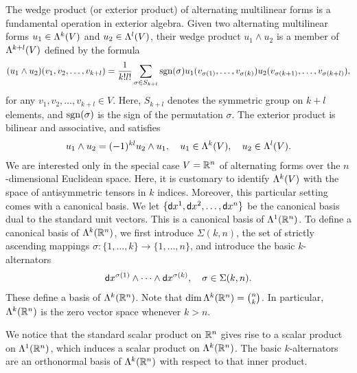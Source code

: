\documentclass[a4paper]{article}
\begin{document}
The wedge product (or exterior product) of alternating multilinear forms is a fundamental operation in exterior algebra. 
Given two alternating multilinear forms \( u_1 \in \Lambda^{k}(V) \) and \( u_2 \in \Lambda^{l}(V) \), 
their wedge product \( u_1 \wedge u_2 \) is a member of $\Lambda^{k+l}(V)$
defined by the formula 
\[
    (u_1 \wedge u_2)(v_1, v_2, \ldots, v_{k+l}) 
    = 
    \frac{1}{k! l!} 
    \sum_{ \sigma \in S_{k+l}} 
    \operatorname{sgn}(\sigma) 
    u_1( v_{\sigma(  1)}, \ldots, v_{\sigma(k  )} ) 
    u_2( v_{\sigma(k+1)}, \ldots, v_{\sigma(k+l)} ),
\]
for any \( v_1, v_2, \ldots, v_{k+l} \in V \).
Here, \( S_{k+l} \) denotes the symmetric group on \( k+l \) elements, and \( \operatorname{sgn}(\sigma) \) is the sign of the permutation \( \sigma \). The exterior product is bilinear and associative, and satisfies 
\begin{align*}
    u_1 \wedge u_2 = (-1)^{kl} u_2 \wedge u_1,
    \quad 
    u_1 \in \Lambda^{k}(V),
    \quad 
    u_2 \in \Lambda^{l}(V).
\end{align*}
We are interested only in the special case $V = {\mathbb R}^{n}$ of alternating forms over the $n$-dimensional Euclidean space. 
Here, it is customary to identify $\Lambda^{k}(V)$ with the space of antisymmetric tensors in $k$ indices. 
Moreover, this particular setting comes with a canonical basis. 
We let \(\{{\mathsf d}x^1, {\mathsf d}x^2, \ldots, {\mathsf d}x^{n}\}\) be the canonical basis dual to the standard unit vectors.
This is a canonical basis of $\Lambda^{1}({\mathbb R}^{n})$. 
To define a canonical basis of $\Lambda^{k}({\mathbb R}^{n})$, 
we first introduce $\Sigma(k,n)$, the set of strictly ascending mappings $\sigma : \{1,\dots,k\} \rightarrow \{1,\dots,n\}$,
and introduce the basic $k$-alternators 
\begin{align*}
    {\mathsf d}x^{\sigma(1)} \wedge \dots \wedge {\mathsf d}x^{\sigma(k)}, \quad \sigma \in \Sigma(k,n). 
\end{align*}
These define a basis of $\Lambda^{k}({\mathbb R}^{n})$.
Note that 
$\dim \Lambda^{k}({\mathbb R}^{n}) = \binom{n}{k}$. 
In particular, $\Lambda^{k}({\mathbb R}^{n})$ is the zero vector space whenever $k > n$.

We notice that the standard scalar product on ${\mathbb R}^{n}$ gives rise to a scalar product on $\Lambda^{1}({\mathbb R}^{n})$,
which induces a scalar product on $\Lambda^{k}({\mathbb R}^{n})$.
The basic $k$-alternators are an orthonormal basis of $\Lambda^{k}({\mathbb R}^{n})$ with respect to that inner product. 
\end{document}
